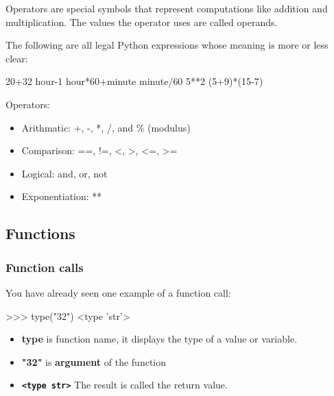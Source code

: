 \documentclass[11pt]{article}
\providecommand{\tightlist}{%
      \setlength{\itemsep}{0pt}\setlength{\parskip}{0pt}}
\newenvironment{Shaded}{}{}
\newcommand{\DecValTok}[1]{\textcolor[rgb]{0.25,0.63,0.44}{{#1}}}
\newcommand{\StringTok}[1]{\textcolor[rgb]{0.25,0.44,0.63}{{#1}}}
\newcommand{\NormalTok}[1]{{#1}}
\newcommand{\OperatorTok}[1]{\textcolor[rgb]{0.40,0.40,0.40}{{#1}}}
\newcommand{\BuiltInTok}[1]{{#1}}
\begin{document}
Operators are special symbols that represent computations like addition
and multiplication. The values the operator uses are called operands.

The following are all legal Python expressions whose meaning is more or
less clear:

\begin{Shaded}
\begin{Highlighting}[]
\DecValTok{20}\OperatorTok{+}\DecValTok{32}\NormalTok{   hour}\OperatorTok{-}\DecValTok{1}\NormalTok{   hour}\OperatorTok{*}\DecValTok{60}\OperatorTok{+}\NormalTok{minute   minute}\OperatorTok{/}\DecValTok{60}   \DecValTok{5}\OperatorTok{**}\DecValTok{2}\NormalTok{   (}\DecValTok{5}\OperatorTok{+}\DecValTok{9}\NormalTok{)}\OperatorTok{*}\NormalTok{(}\DecValTok{15}\OperatorTok{-}\DecValTok{7}\NormalTok{) }
\end{Highlighting}
\end{Shaded}

Operators:

\begin{itemize}
\tightlist
\item
  Arithmatic: +, -, *, /, and \% (modulus)
\item
  Comparison: ==, !=, \textless{}, \textgreater{}, \textless{}=,
  \textgreater{}=
\item
  Logical: and, or, not
\item
  Exponentiation: **
\end{itemize}

    \subsection{Functions}\label{functions}

\subsubsection{Function calls}\label{function-calls}

You have already seen one example of a function call:

\begin{Shaded}
\begin{Highlighting}[]
\OperatorTok{>>>} \BuiltInTok{type}\NormalTok{(}\StringTok{"32"}\NormalTok{) }
\OperatorTok{<}\BuiltInTok{type} \StringTok{'str'}\OperatorTok{>} 
\end{Highlighting}
\end{Shaded}

\begin{itemize}
\tightlist
\item
  \textbf{type} is function name, it displays the type of a value or
  variable.
\item
  \textbf{"32"} is \textbf{argument} of the function
\item
  \textbf{\texttt{\textless{}type\ \textquotesingle{}str\textquotesingle{}\textgreater{}}}
  The result is called the return value.
\end{itemize}
\end{document}

